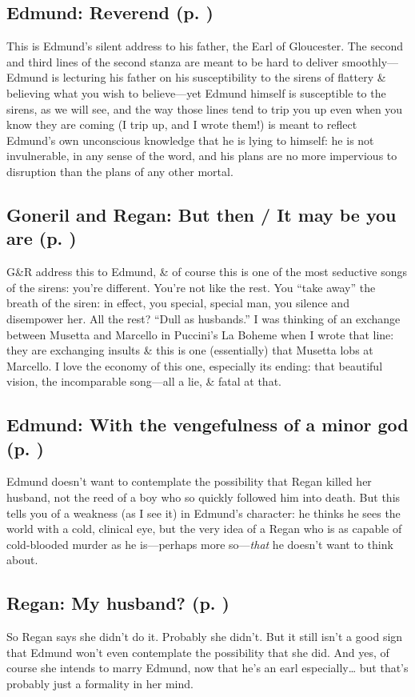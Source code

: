 \subsection{Edmund: Reverend (p. \pageref{ch:lear_al})}
This is Edmund's silent address to his father, the Earl of Gloucester. The second and third lines of the second stanza are meant to be hard to deliver smoothly---Edmund is lecturing his father on his susceptibility to the sirens of flattery \& believing what you wish to believe---yet Edmund himself is susceptible to the sirens, as we will see, and the way those lines tend to trip you up even when you know they are coming (I trip up, and I wrote them!) is meant to reflect Edmund's own unconscious knowledge that he is lying to himself: he is not invulnerable, in any sense of the word, and his plans are no more impervious to disruption than the plans of any other mortal.

\subsection{Goneril and Regan: But then / It may be you are (p. \pageref{ch:lear_am})}
G\&R address this to Edmund, \& of course this is one of the most seductive songs of the sirens: you're different. You're not like the rest. You ``take away'' the breath of the siren: in effect, you special, special man, you silence and disempower her. All the rest? ``Dull as husbands.'' I was thinking of an exchange between Musetta and Marcello in Puccini's La Boheme when I wrote that line: they are exchanging insults \& this is one (essentially) that Musetta lobs at Marcello. I love the economy of this one, especially its ending: that beautiful vision, the incomparable song---all a lie, \& fatal at that.

\subsection{Edmund: With the vengefulness of a minor god (p. \pageref{ch:lear_an})}
Edmund doesn't want to contemplate the possibility that Regan killed her husband, not the reed of a boy who so quickly followed him into death. But this tells you of a weakness (as I see it) in Edmund's character: he thinks he sees the world with a cold, clinical eye, but the very idea of a Regan who is as capable of cold-blooded murder as he is---perhaps more so---\emph{that} he doesn't want to think about.

\subsection{Regan: My husband? (p. \pageref{ch:lear_ao})}
So Regan says she didn't do it. Probably she didn't. But it still isn't a good sign that Edmund won't even contemplate the possibility that she did. And yes, of course she intends to marry Edmund, now that he's an earl especially\ldots{} but that's probably just a formality in her mind.

